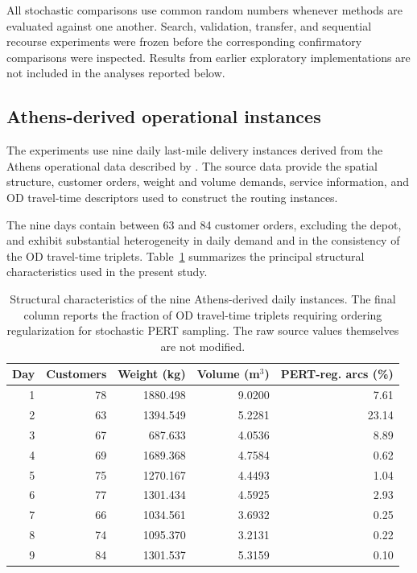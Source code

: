 \documentclass[preprint,12pt]{elsarticle}
\newcommand{\1}{\mathbf{1}}
\begin{document}
All stochastic comparisons use common random numbers whenever methods are
evaluated against one another. Search, validation, transfer, and sequential
recourse experiments were frozen before the corresponding confirmatory
comparisons were inspected. Results from earlier exploratory implementations are
not included in the analyses reported below.

\subsection{Athens-derived operational instances}
\label{subsec:instances}

The experiments use nine daily last-mile delivery instances derived from the
Athens operational data described by \citet{Vrani2025DataInBrief}.
The source data provide the spatial structure, customer orders, weight and
volume demands, service information, and OD travel-time descriptors used to
construct the routing instances.

The nine days contain between 63 and 84 customer orders, excluding the depot,
and exhibit substantial heterogeneity in daily demand and in the consistency of
the OD travel-time triplets. Table~\ref{tab:instance_characteristics}
summarizes the principal structural characteristics used in the present study.

\begin{table}[t]
	\centering
	\caption{Structural characteristics of the nine Athens-derived daily instances.
		The final column reports the fraction of OD travel-time triplets requiring
		ordering regularization for stochastic PERT sampling. The raw source values
		themselves are not modified.}
	\label{tab:instance_characteristics}
	\begin{tabular}{rrrrr}
		\toprule
		Day &
		Customers &
		Weight (kg) &
		Volume (m$^3$) &
		PERT-reg. arcs (\%) \\
		\midrule
		1 & 78 & 1880.498 & 9.0200 & 7.61 \\
		2 & 63 & 1394.549 & 5.2281 & 23.14 \\
		3 & 67 &  687.633 & 4.0536 & 8.89 \\
		4 & 69 & 1689.368 & 4.7584 & 0.62 \\
		5 & 75 & 1270.167 & 4.4493 & 1.04 \\
		6 & 77 & 1301.434 & 4.5925 & 2.93 \\
		7 & 66 & 1034.561 & 3.6932 & 0.25 \\
		8 & 74 & 1095.370 & 3.2131 & 0.22 \\
		9 & 84 & 1301.537 & 5.3159 & 0.10 \\
		\bottomrule
	\end{tabular}
\end{table}
\end{document}
